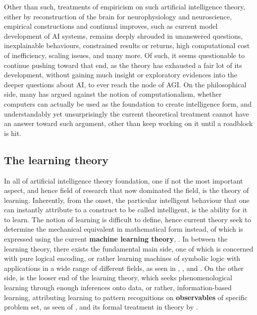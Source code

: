 Other than such, treatments of empiricism on such artificial intelligence theory, either by reconstruction of the brain for neurophysiology and neuroscience, empirical constructions and continual improves, such as current model development of AI systems, remains deeply shrouded in unanswered questions, inexplainable behaviours, constrained results or returns, high computational cost of inefficiency, scaling issues, and many more. Of such, it seems questionable to continue pushing toward that end, as the theory has exhausted a fair lot of its development, without gaining much insight or exploratory evidences into the deeper questions about AI, to ever reach the node of AGI. On the philosophical side, many has argued against the notion of computationalism, whether computers can actually be used as the foundation to create intelligence form, and understandably yet unsurprisingly the current theoretical treatment cannot have an answer toward such argument, other than keep working on it until a roadblock is hit. 

\subsection{The learning theory}

In all of artificial intelligence theory foundation, one if not the most important aspect, and hence field of research that now dominated the field, is the theory of learning. Inherently, from the onset, the particular intelligent behaviour that one can instantly attribute to a construct to be called intelligent, is the ability for it to learn. The notion of learning is difficult to define, hence current theory seek to determine the mechanical equivalent in mathematical form instead, of which is expressed using the current \textbf{machine learning theory}, \cite{10.1145/1968.1972,wolpert1996lack,shalev-shwartz2010learnability}. In between the learning theory, there exists the fundamental main side, one of which is concerned with pure logical encoding, or rather learning machines of symbolic logic with applications in a wide range of different fields, as seen in \cite{1056797NewellSimon,newell1959gps,winograd1972understanding,michalski1969aq}, \cite{minsky1961steps,minsky1968semantic}, and \cite{quinlan1986induction}. On the other side, is the looser end of the learning theory, which seeks phenomenological learning through enough inferences onto data, or rather, information-based learning, attributing learning to pattern recognitions on \textbf{observables} of specific problem set, as seen of \cite{solomonoff1964formal1,solomonoff1964formal2,gold1967language,newell1958elements,cover1965geometrical}, and its formal treatment in theory by \cite{vapnik1968uniform,Vapnik1999-VAPTNO,vapnik1971uniform,valiant1984learnable,angluin1988queries,computationallimits1989,board1992necessity,STL_Hajek_Maxim_2021,10.5555/2371238,10.5555/2621980}.  

